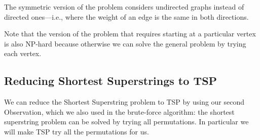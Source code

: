 \begin{gram}
The symmetric version of the problem considers undirected graphs
instead of directed ones---i.e., where the weight of an edge is the
same in both directions.
\end{gram}

\begin{note}
  Note that the version of the problem that requires starting at a
  particular vertex is also NP-hard because otherwise we can solve the
  general problem by trying each vertex.
\end{note}

\subsection{Reducing Shortest Superstrings to TSP}

\begin{gram}
We can reduce the Shortest Superstring problem to TSP by using 
our second Observation, which we also used in the brute-force
algorithm: the shortest superstring problem can be solved by trying
all permutations.
%
In particular we will make TSP try all the permutations for us.
%
\end{gram}


